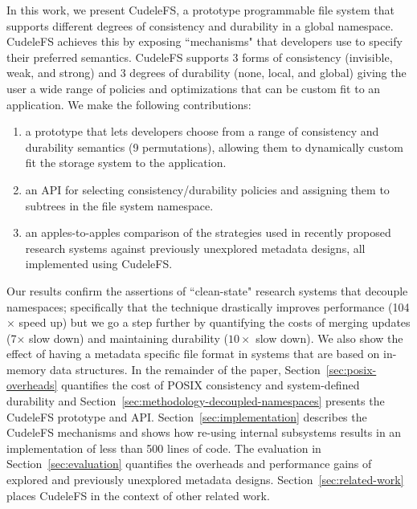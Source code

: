 In this work, we present CudeleFS, a prototype programmable file system that
supports different degrees of consistency and durability in a global namespace.
CudeleFS achieves this by exposing ``mechanisms" that developers use to specify
their preferred semantics.  CudeleFS supports 3 forms of consistency
(invisible, weak, and strong) and 3 degrees of durability (none, local, and
global) giving the user a wide range of policies and optimizations that can be
custom fit to an application. We make the following contributions:

\begin{enumerate}

  \item a prototype that lets developers choose from a range of
  consistency and durability semantics (9 permutations), allowing them to dynamically custom
  fit the storage system to the application.

  \item an API for selecting consistency/durability policies and assigning
  them to subtrees in the file system namespace.

  \item an apples-to-apples comparison of the strategies used in recently proposed research systems against
  previously unexplored metadata designs, all implemented using CudeleFS.

\end{enumerate}

Our results confirm the assertions of ``clean-state" research systems that
decouple namespaces; specifically that the technique drastically improves
performance (104\(\times\) speed up) but we go a step further by quantifying
the costs of merging updates (7\(\times\) slow down) and maintaining durability
(\(10\times\) slow down). We also show the effect of having a metadata specific
file format in systems that are based on in-memory data structures.
In the remainder of the paper, Section~\ref{sec:posix-overheads} quantifies the cost of POSIX
consistency and system-defined durability and
Section~\ref{sec:methodology-decoupled-namespaces} presents the CudeleFS
prototype and API. Section~\ref{sec:implementation} describes the CudeleFS
mechanisms and shows how re-using internal subsystems results in an
implementation of less than 500 lines of code. The evaluation in
Section~\ref{sec:evaluation} quantifies the overheads and performance gains of
explored and previously unexplored metadata designs.
Section~\ref{sec:related-work} places CudeleFS in the context of other related
work.

